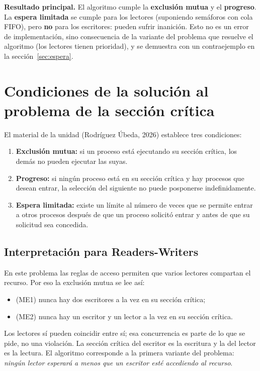\documentclass[12pt,letterpaper]{article}
\theoremstyle{definition}
\begin{document}
\textbf{Resultado principal.} El algoritmo cumple la \textbf{exclusión mutua} y el \textbf{progreso}. La \textbf{espera limitada} se cumple para los lectores (suponiendo semáforos con cola FIFO), pero \textbf{no} para los escritores: pueden sufrir inanición. Esto no es un error de implementación, sino consecuencia de la variante del problema que resuelve el algoritmo (los lectores tienen prioridad), y se demuestra con un contraejemplo en la sección~\ref{sec:espera}.

\section{Condiciones de la solución al problema de la sección crítica}
El material de la unidad (Rodríguez Úbeda, 2026) establece tres condiciones:
\begin{enumerate}[itemsep=2pt]
\item \textbf{Exclusión mutua:} si un proceso está ejecutando su sección crítica, los demás no pueden ejecutar las suyas.
\item \textbf{Progreso:} si ningún proceso está en su sección crítica y hay procesos que desean entrar, la selección del siguiente no puede posponerse indefinidamente.
\item \textbf{Espera limitada:} existe un límite al número de veces que se permite entrar a otros procesos después de que un proceso solicitó entrar y antes de que su solicitud sea concedida.
\end{enumerate}

\subsection*{Interpretación para Readers-Writers}
En este problema las reglas de acceso permiten que varios lectores compartan el recurso. Por eso la exclusión mutua se lee así:
\begin{itemize}[itemsep=2pt]
\item (ME1) nunca hay dos escritores a la vez en su sección crítica;
\item (ME2) nunca hay un escritor y un lector a la vez en su sección crítica.
\end{itemize}
Los lectores sí pueden coincidir entre sí; esa concurrencia es parte de lo que se pide, no una violación. La sección crítica del escritor es la escritura y la del lector es la lectura. El algoritmo corresponde a la primera variante del problema: \emph{ningún lector esperará a menos que un escritor esté accediendo al recurso}.
\end{document}

